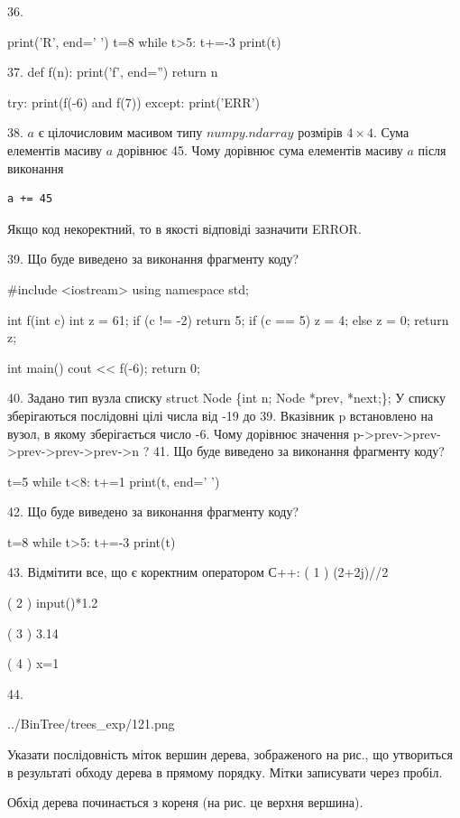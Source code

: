 \documentclass[11pt]{article}
\begin{document}
36. 

print('R', end=' ')
t=8
while t>5:
    t+=-3
print(t)


37. 
def f(n):
    print('f', end='')
    return n

try:
    print(f(-6) and f(7))
except:
    print('ERR')

38. 
$a$ є цілочисловим масивом типу $numpy.ndarray$ розмірів $4{\times}4$. Сума елементів масиву $a$ дорівнює 45. Чому дорівнює сума елементів масиву $a$ після виконання 
\begin{verbatim}
a += 45
\end{verbatim}


Якщо код некоректний, то в якості відповіді зазначити ERROR.



39. Що буде виведено за виконання фрагменту коду?

#include <iostream>
using namespace std;

int f(int c){
    int z = 61;
    if (c != -2) 
        return 5;
    if (c == 5)
         z = 4;
    else
         z = 0;
    return z;
}

int main(){
    cout << f(-6);
    return 0;
}


40. 
Задано тип вузла списку
struct Node \{int n; Node *prev, *next;\};
У списку зберігаються послідовні цілі числа від -19 до 39. Вказівник p встановлено на вузол, в якому зберігається число -6.
Чому дорівнює значення p->prev->prev->prev->prev->prev->n ?
41. Що буде виведено за виконання фрагменту коду?

t=5
while t<8:
    t+=1
print(t, end=' ')


42. Що буде виведено за виконання фрагменту коду?

t=8
while t>5:
    t+=-3
print(t)


43. %
Відмітити все, що є коректним оператором С++:
( 1 ) (2+2j)//2

( 2 ) input()*1.2

( 3 ) 3.14%

( 4 ) x=1%

44. 

\begin{center}
	{../BinTree/trees_exp/121.png}
\end{center}
Указати послідовність міток вершин дерева, зображеного на рис., що утвориться в результаті обходу дерева в прямому порядку. Мітки записувати через пробіл.\par Обхід дерева починається з кореня (на рис. це верхня вершина).
\end{document}
